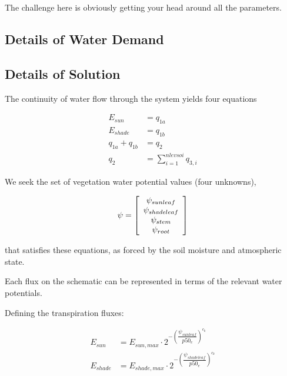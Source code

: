 \documentclass[draft,linenumbers]{agujournal}
\begin{document}
The challenge here is obviously getting your head around all the parameters.

\subsection{Details of Water Demand}

\subsection{Details of Solution}


The continuity of water flow through the system yields four equations
   \begin{linenomath*} \begin{equation}
   \begin{aligned}
   E_{sun}&=q_{1a}\\
   E_{shade}&=q_{1b}\\
   q_{1a}+q_{1b}&=q_2\\
   q_2&=\sum_{i=1}^{nlevsoi}{q_{3,i}}
   \end{aligned}
   \end{equation} \end{linenomath*}

We seek the set of vegetation water potential values (four unknowns), 

   \begin{linenomath*} \begin{equation}
   \psi=\left[ \begin {array}{c} 
   \psi_{sunleaf}\cr\psi_{shadeleaf}\cr\psi_{stem}\cr\psi_{root}
   \end {array} \right] 
   \end{equation} \end{linenomath*}

that satisfies these equations, as forced by the soil moisture and atmospheric state. 

Each flux on the schematic can be represented in terms of the relevant water potentials. 

Defining the transpiration fluxes:


   \begin{linenomath*} \begin{equation}
   \begin{aligned}
   E_{sun} &= E_{sun,max} \cdot 2^{-\left(\dfrac{\psi_{sunleaf}}{p50_e}\right)^{c_k}} \\
   E_{shade} &= E_{shade,max} \cdot 2^{-\left(\dfrac{\psi_{shadeleaf}}{p50_e}\right)^{c_k}} 
   \end{aligned}
   \end{equation} \end{linenomath*}
\end{document}

